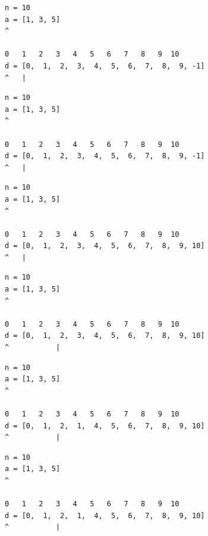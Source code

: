 \begin{frame}[fragile]
\begin{verbatim}
n = 10
a = [1, 3, 5]
^

0   1   2   3   4   5   6   7   8   9  10
d = [0,  1,  2,  3,  4,  5,  6,  7,  8,  9, -1]
^   |
\end{verbatim}
\end{frame}
\addtocounter{framenumber}{-1}

\begin{frame}[fragile]
\begin{verbatim}
n = 10
a = [1, 3, 5]
^

0   1   2   3   4   5   6   7   8   9  10
d = [0,  1,  2,  3,  4,  5,  6,  7,  8,  9, -1]
^   |
\end{verbatim}
\end{frame}
\addtocounter{framenumber}{-1}

\begin{frame}[fragile]
\begin{verbatim}
n = 10
a = [1, 3, 5]
^

0   1   2   3   4   5   6   7   8   9  10
d = [0,  1,  2,  3,  4,  5,  6,  7,  8,  9, 10]
^   |
\end{verbatim}
\end{frame}
\addtocounter{framenumber}{-1}

\begin{frame}[fragile]
\begin{verbatim}
n = 10
a = [1, 3, 5]
^

0   1   2   3   4   5   6   7   8   9  10
d = [0,  1,  2,  3,  4,  5,  6,  7,  8,  9, 10]
^           |
\end{verbatim}
\end{frame}
\addtocounter{framenumber}{-1}

\begin{frame}[fragile]
\begin{verbatim}
n = 10
a = [1, 3, 5]
^

0   1   2   3   4   5   6   7   8   9  10
d = [0,  1,  2,  1,  4,  5,  6,  7,  8,  9, 10]
^           |
\end{verbatim}
\end{frame}
\addtocounter{framenumber}{-1}

\begin{frame}[fragile]
\begin{verbatim}
n = 10
a = [1, 3, 5]
^

0   1   2   3   4   5   6   7   8   9  10
d = [0,  1,  2,  1,  4,  5,  6,  7,  8,  9, 10]
^           |
\end{verbatim}
\end{frame}
\addtocounter{framenumber}{-1}

